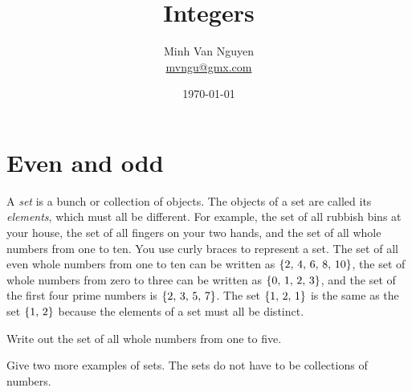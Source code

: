\documentclass[a4paper,oneside,12pt]{article}
\begin{document}
\title{\Large\bf Integers}
\author{%
  Minh Van Nguyen \\
  \url{mvngu@gmx.com}
}
\date{\today}
\maketitle



\section{Even and odd}

A \emph{set} is a bunch or collection of objects.  The objects of a
set are called its \emph{elements}, which must all be different.  For
example, the set of all rubbish bins at your house, the set of all
fingers on your two hands, and the set of all whole numbers from one
to ten.  You use curly braces to represent a set.  The set of all even
whole numbers from one to ten can be written as
$\left\lbrace{2},\, {4},\, {6},\, {8},\, {10}\right\rbrace$, the set of whole numbers from zero
to three can be written as $\left\lbrace{0},\, {1},\, {2},\, {3}\right\rbrace$, and the set
of the first four prime numbers is $\left\lbrace{2},\, {3},\, {5},\, {7}\right\rbrace$.
The set $\left\lbrace{1},\, {2},\, {1}\right\rbrace$ is the same as the set
$\left\lbrace{1},\, {2}\right\rbrace$ because the elements of a set must all be
distinct.

\begin{exercise}
Write out the set of all whole numbers from one to five.
\end{exercise}


\begin{exercise}
Give two more examples of sets.  The sets do not have to be
collections of numbers.
\end{exercise}

\end{document}
